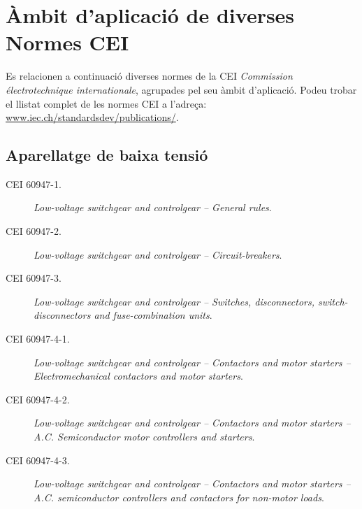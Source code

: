 \section{Àmbit d'aplicació de diverses Normes CEI}\label{sec:normes_IEC}

Es relacionen a continuació diverses normes de la CEI \textit{Commission électrotechnique internationale}, agrupades pel seu àmbit d'aplicació. Podeu trobar el llistat complet de les normes CEI a l'adreça: \href{http://www.iec.ch/standardsdev/publications/}{www.iec.ch/standardsdev/publications/}.

\subsection*{Aparellatge de baixa tensió}
\begin{description}
    \item [\hspace{5mm}CEI 60947-1.] \textit{Low-voltage switchgear and controlgear -- General rules}.
    \item [\hspace{5mm}CEI 60947-2.] \textit{Low-voltage switchgear and controlgear -- Circuit-breakers}.
    \item [\hspace{5mm}CEI 60947-3.] \textit{Low-voltage switchgear and controlgear -- Switches, disconnectors, switch-dis\-con\-nec\-tors and fuse-combination units}.
    \item [\hspace{5mm}CEI 60947-4-1.] \textit{Low-voltage switchgear and controlgear -- Contactors and motor starters -- Electromechanical contactors and motor starters}.
    \item [\hspace{5mm}CEI 60947-4-2.] \textit{Low-voltage switchgear and controlgear -- Contactors and motor starters -- A.C. Semiconductor motor controllers and starters}.
    \item [\hspace{5mm}CEI 60947-4-3.] \textit{Low-voltage switchgear and controlgear -- Contactors and motor starters -- A.C. semiconductor controllers and contactors for non-motor loads}.
\end{description}

